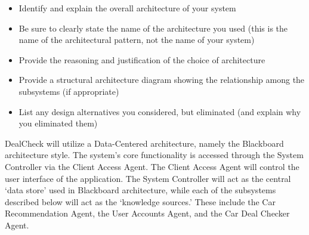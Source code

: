 \documentclass[]{article}
\begin{document}
\label{sub:system_architecture}
\begin{itemize}
	\item Identify and explain the overall architecture of your system
	\item Be sure to clearly state the name of the architecture you used (this is the name of the architectural pattern, not the name of your system)
	\item Provide the reasoning and justification of the choice of architecture
	\item Provide a structural architecture diagram showing the relationship among the subsystems (if appropriate)
	\item List any design alternatives you considered, but eliminated (and explain why you eliminated them)
\end{itemize}

DealCheck will utilize a Data-Centered architecture, namely the Blackboard architecture style. The system's core functionality is accessed through the System Controller via the Client Access Agent. The Client Access Agent will control the user interface of the application. The System Controller will act as the central ‘data store’ used in Blackboard architecture, while each of the subsystems described below will act as the ‘knowledge sources.’ These include the Car Recommendation Agent, the User Accounts Agent, and the Car Deal Checker Agent. \\
\end{document}
